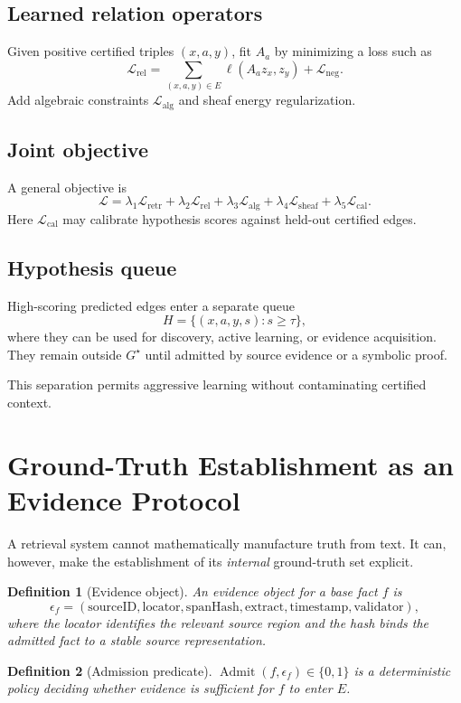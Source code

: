 \documentclass[11pt]{article}
\newtheorem{definition}{Definition}[section]
\newcommand{\Lcal}{\mathcal{L}}
\begin{document}
\subsection{Learned relation operators}
Given positive certified triples $(x,a,y)$, fit $A_a$ by minimizing a loss such as
\[
\Lcal_{\mathrm{rel}}=\sum_{(x,a,y)\in E}\ell(A_a z_x,z_y)+\Lcal_{\mathrm{neg}}.
\]
Add algebraic constraints $\Lcal_{\mathrm{alg}}$ and sheaf energy regularization.

\subsection{Joint objective}
A general objective is
\[
\Lcal=
\lambda_1\Lcal_{\mathrm{retr}}
+\lambda_2\Lcal_{\mathrm{rel}}
+\lambda_3\Lcal_{\mathrm{alg}}
+\lambda_4\Lcal_{\mathrm{sheaf}}
+\lambda_5\Lcal_{\mathrm{cal}}.
\]
Here $\Lcal_{\mathrm{cal}}$ may calibrate hypothesis scores against held-out certified edges.

\subsection{Hypothesis queue}
High-scoring predicted edges enter a separate queue
\[
H=\{(x,a,y,s): s\ge \tau\},
\]
where they can be used for discovery, active learning, or evidence acquisition. They remain outside $G^{\star}$ until admitted by source evidence or a symbolic proof.

This separation permits aggressive learning without contaminating certified context.

\section{Ground-Truth Establishment as an Evidence Protocol}
\label{sec:evidence}

A retrieval system cannot mathematically manufacture truth from text. It can, however, make the establishment of its \emph{internal} ground-truth set explicit.

\begin{definition}[Evidence object]
An evidence object for a base fact $f$ is
\[
\epsilon_f=(\mathrm{sourceID},\mathrm{locator},\mathrm{spanHash},\mathrm{extract},\mathrm{timestamp},\mathrm{validator}),
\]
where the locator identifies the relevant source region and the hash binds the admitted fact to a stable source representation.
\end{definition}

\begin{definition}[Admission predicate]
$\operatorname{Admit}(f,\epsilon_f)\in\{0,1\}$ is a deterministic policy deciding whether evidence is sufficient for $f$ to enter $E$.
\end{definition}
\end{document}
